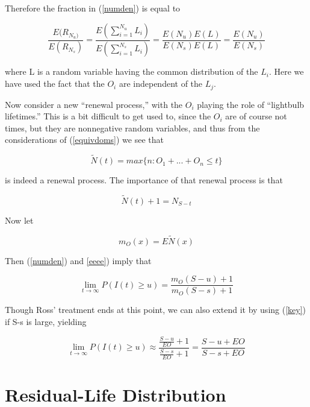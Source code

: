 Therefore the fraction in (\ref{numden}) is equal to

\begin{equation}
\label{eeee}
\frac{E(R_{N_u)}}{E(R_{N_s})} =
\frac{E(\sum ^{N_{u}}_{i=1}L_{i})}{E(\sum ^{N_{s}}_{i=1}L_{i})} =
\frac{E(N_{u}) E(L)}{E(N_{s}) E(L)} =
\frac{E(N_{u})}{E(N_{s})}
\end{equation}

where L is a random variable having the common distribution of the $L_i$.
Here we have used the fact that the $O_i$ are independent of the $L_j$.

Now consider a new ``renewal process,'' with the $O_{i}$ playing the
role of ``lightbulb lifetimes.''  This is a bit difficult to get used
to, since the $O_{i}$ are of course not times, but they are nonnegative
random variables, and thus from the considerations of (\ref{equivdoms})
we see that

\begin{equation}
\tilde{N}(t) = max\{ n: O_1+...+O_n \leq t \}
\end{equation}

is indeed a renewal process.  The importance of that renewal process is
that

\begin{equation}
\tilde{N}(t) + 1 = N_{S-t}
\end{equation}

Now let 

\begin{equation}
m_{O}(x) = E \tilde{N}(x)
\end{equation}

Then (\ref{numden}) and \ref{eeee}) imply that

\begin{equation}
\lim_{t\rightarrow \infty }P(I(t)\geq u)=\frac{m_{O}(S-u)+1}{m_{O}(S-s)+1}
\end{equation}

Though Ross' treatment ends at this point, we can also extend it by
using (\ref{key}) if S-s is large, yielding

\begin{equation}
\lim_{t\rightarrow \infty }P(I(t)\geq u) \approx
\frac{\frac{S-u}{EO}+1}{\frac{S-s}{EO}+1} =
\frac{S-u+EO}{S-s+EO}
\end{equation}

\section{Residual-Life Distribution}
\label{reslife}

